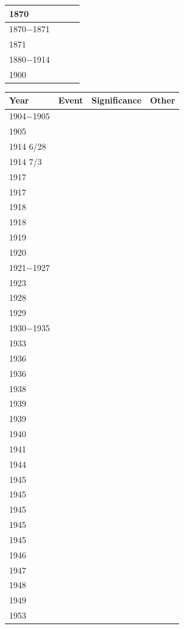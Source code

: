 \documentclass[12pt]{article}
\begin{document}
\begin{enumerate}
\begin{tabular}{|l|l|l|l|}
\hline
1870 & & & \\
\hline
1870$-$1871 & & & \\
\hline
1871 & & & \\
\hline
1880$-$1914 & & & \\
\hline
1900 & & & \\
\hline
\end{tabular}
\newpage
\begin{tabular}{|l|l|l|l|}
\hline
Year & Event & Significance & Other \\
\hline
1904$-$1905 & & & \\
\hline
1905 & & & \\
\hline
1914 6/28 & & & \\
\hline
1914 7/3 & & & \\
\hline
1917 & & & \\
\hline
1917 & & & \\
\hline
1918 & & & \\
\hline
1918 & & & \\
\hline
1919 & & & \\
\hline
1920 & & & \\
\hline
1921$-$1927 & & & \\
\hline
1923 & & & \\
\hline
1928 & & & \\
\hline
1929 & & & \\
\hline
1930$-$1935 & & & \\
\hline
1933 & & & \\
\hline
1936 & & & \\
\hline
1936 & & & \\
\hline
1938 & & & \\
\hline
1939 & & & \\
\hline
1939 & & & \\
\hline 
1940 & & & \\
\hline
1941 & & & \\
\hline
1944 & & & \\
\hline
1945 & & & \\
\hline
1945 & & & \\
\hline
1945 & & & \\
\hline
1945 & & & \\
\hline
1945 & & & \\
\hline
1946 & & & \\
\hline
1947 & & & \\
\hline
1948 & & & \\
\hline
1949 & & & \\
\hline
1953 & & & \\

\end{tabular}
\end{enumerate}
\end{document}
